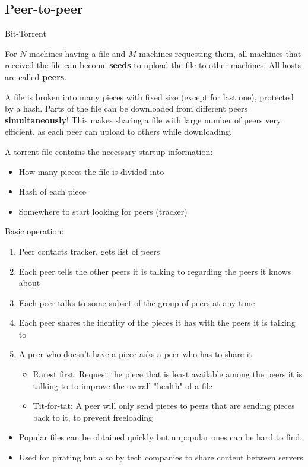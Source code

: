 \subsection{Peer-to-peer}

\begin{theorem}
    {Bit-Torrent}

    For $N$ machines having a file and $M$ machines requesting them, all machines that received the file can become \textbf{seeds} to upload the file to other machines. All hosts are called \textbf{peers}.

    A file is broken into many pieces with fixed size (except for last one), protected by a hash. Parts of the file can be downloaded from different peers \textbf{simultaneously}! This makes sharing a file with large number of peers very efficient, as each peer can upload to others while downloading.

    A torrent file contains the necessary startup information:
    \begin{itemize}
        \item How many pieces the file is divided into
        \item Hash of each piece
        \item Somewhere to start looking for peers (tracker)
    \end{itemize}

    Basic operation:
    \begin{enumerate}
        \item Peer contacts tracker, gets list of peers
        \item Each peer tells the other peers it is talking to regarding the peers it knows about
        \item Each peer talks to some subset of the group of peers at any time
        \item Each peer shares the identity of the pieces it has with the peers it is talking to
        \item A peer who doesn’t have a piece asks a peer who has to share it \begin{itemize}
                  \item Rarest first: Request the piece that is least available among the peers it is talking to to improve the overall "health" of a file
                  \item Tit-for-tat: A peer will only send pieces to peers that are sending pieces back to it, to prevent freeloading
              \end{itemize}
    \end{enumerate}

    \begin{itemize}
        \item Popular files can be obtained quickly but unpopular ones can be hard to find.
        \item Used for pirating but also by tech companies to share content between servers
    \end{itemize}
\end{theorem}

